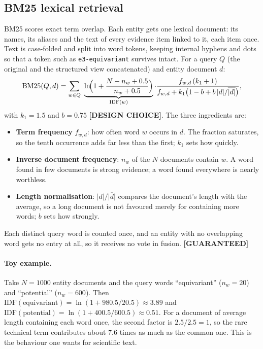 \documentclass[11pt,a4paper]{article}
\theoremstyle{remark}
\newcommand{\code}[1]{\texttt{\small #1}}
\newcommand{\vtag}[2]{{\sffamily\scriptsize\bfseries\textcolor{#1}{[#2]}}}
\newcommand{\Gtag}{\vtag{accent}{GUARANTEED}}
\newcommand{\Dtag}{\vtag{black!60}{DESIGN CHOICE}}
\begin{document}
\subsection{BM25 lexical retrieval}
\label{sec:bm25}

BM25 \citep{robertson2009bm25} scores exact term overlap. Each entity gets one lexical
document: its names, its aliases and the text of every evidence item linked to it, each
item once. Text is case-folded and split into word tokens, keeping internal hyphens and
dots so that a token such as \code{e3-equivariant} survives intact. For a query $Q$ (the
original and the structured view concatenated) and entity document $d$:
\begin{equation}
  \mathrm{BM25}(Q,d)=\sum_{w\in Q}\ \underbrace{\ln\!\Bigl(1+\frac{N-n_w+0.5}{n_w+0.5}\Bigr)}_{\text{IDF}(w)}
  \cdot\frac{f_{w,d}\,(k_1+1)}{f_{w,d}+k_1\bigl(1-b+b\,|d|/\overline{|d|}\bigr)},
\label{eq:bm25}
\end{equation}
with $k_1=1.5$ and $b=0.75$ \Dtag. The three ingredients are:
\begin{itemize}
  \item \textbf{Term frequency} $f_{w,d}$: how often word $w$ occurs in $d$. The fraction
        saturates, so the tenth occurrence adds far less than the first; $k_1$ sets how
        quickly.
  \item \textbf{Inverse document frequency}: $n_w$ of the $N$ documents contain $w$. A word
        found in few documents is strong evidence; a word found everywhere is nearly
        worthless.
  \item \textbf{Length normalisation}: $|d|/\overline{|d|}$ compares the document's length
        with the average, so a long document is not favoured merely for containing more
        words; $b$ sets how strongly.
\end{itemize}
Each distinct query word is counted once, and an entity with no overlapping word gets no
entry at all, so it receives no vote in fusion. \Gtag

\paragraph{Toy example.} Take $N=1000$ entity documents and the query words
``equivariant'' ($n_w=20$) and ``potential'' ($n_w=600$). Then
$\mathrm{IDF}(\text{equivariant})=\ln(1+980.5/20.5)\approx3.89$ and
$\mathrm{IDF}(\text{potential})=\ln(1+400.5/600.5)\approx0.51$. For a document of average
length containing each word once, the second factor is $2.5/2.5=1$, so the rare technical
term contributes about 7.6 times as much as the common one. This is the behaviour one
wants for scientific text.
\end{document}
